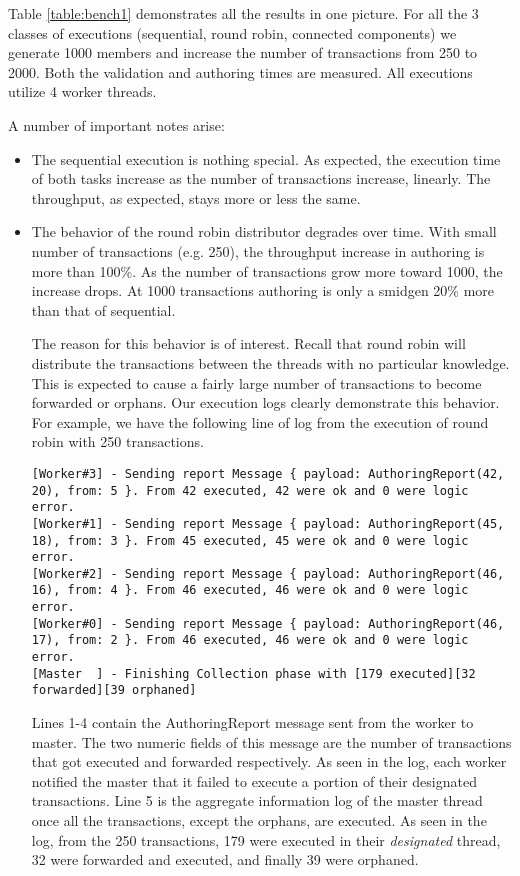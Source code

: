 
Table \ref{table:bench1} demonstrates all the results in one picture. For all the 3 classes of
executions (sequential, round robin, connected components) we generate 1000 members and increase
the number of transactions from 250 to 2000. Both the validation and authoring times are measured.
All executions utilize 4 worker threads.

A number of important notes arise:

\begin{itemize}
	\item The sequential execution is nothing special. As expected, the execution time of both tasks
	increase as the number of transactions increase, linearly. The throughput, as expected, stays
	more or less the same.
	\item The behavior of the round robin distributor degrades over time. With small number of
	transactions (e.g. 250), the throughput increase in authoring is more than 100\%. As the number
	of transactions grow more toward 1000, the increase drops. At 1000 transactions authoring is
	only a smidgen 20\% more than that of sequential.

	The reason for this behavior is of interest. Recall that round robin will distribute the
	transactions between the threads with no particular knowledge. This is expected to cause a
	fairly large number of transactions to become forwarded or orphans. Our execution logs clearly
	demonstrate this behavior. For example, we have the following line of log from the execution of
	round robin with 250 transactions.

	\begin{lstlisting}
[Worker#3] - Sending report Message { payload: AuthoringReport(42, 20), from: 5 }. From 42 executed, 42 were ok and 0 were logic error.
[Worker#1] - Sending report Message { payload: AuthoringReport(45, 18), from: 3 }. From 45 executed, 45 were ok and 0 were logic error.
[Worker#2] - Sending report Message { payload: AuthoringReport(46, 16), from: 4 }. From 46 executed, 46 were ok and 0 were logic error.
[Worker#0] - Sending report Message { payload: AuthoringReport(46, 17), from: 2 }. From 46 executed, 46 were ok and 0 were logic error.
[Master  ] - Finishing Collection phase with [179 executed][32 forwarded][39 orphaned]
	\end{lstlisting}

	Lines 1-4 contain the AuthoringReport message sent from the worker to master. The two numeric
	fields of this message are the number of transactions that got executed and forwarded
	respectively. As seen in the log, each worker notified the master that it failed to execute a
	portion of their designated transactions. Line 5 is the aggregate information log of the master
	thread once all the transactions, except the orphans, are executed. As seen in the log, from the
	250 transactions, 179 were executed in their \textit{designated} thread, 32 were forwarded and
	executed, and finally 39 were orphaned.


\end{itemize}
